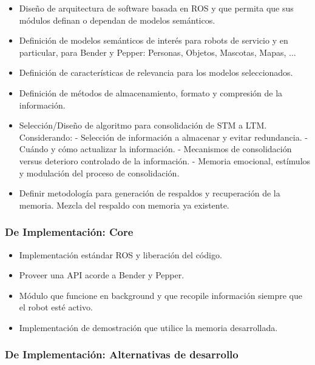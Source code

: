 \documentclass[12pt,letterpaper,spanish]{article}
\begin{document}
\begin{itemize}
\item Dise\~no de arquitectura de software basada en ROS y que permita que sus m\'odulos definan o dependan de modelos sem\'anticos. 
\item Definici\'on de modelos sem\'anticos de inter\'es para robots de servicio y en particular, para Bender y Pepper: Personas, Objetos, Mascotas, Mapas, ...
\item Definici\'on de caracter\'isticas de relevancia para los modelos seleccionados.
\item Definici\'on de m\'etodos de almacenamiento, formato y compresi\'on de la informaci\'on.
\item Selecci\'on/Dise\~no de algoritmo para consolidaci\'on de STM a LTM. Considerando:
\subitem - Selecci\'on de informaci\'on a almacenar y evitar redundancia.
\subitem - Cu\'ando y c\'omo actualizar la informaci\'on.
\subitem - Mecanismos de consolidaci\'on versus deterioro controlado de la informaci\'on.
\subitem - Memoria emocional, est\'imulos y modulaci\'on del proceso de consolidaci\'on.
\item Definir metodolog\'ia para generaci\'on de respaldos y recuperaci\'on de la memoria. Mezcla del respaldo con memoria ya existente.
\end{itemize}

\subsubsection{De Implementaci\'on: Core}

\begin{itemize}
\item Implementaci\'on est\'andar ROS y liberaci\'on del c\'odigo.
\item Proveer una API acorde a Bender y Pepper.
\item M\'odulo que funcione en background y que recopile informaci\'on siempre que el robot est\'e activo.
\item Implementaci\'on de demostraci\'on que utilice la memoria desarrollada.
\end{itemize}

\subsubsection{De Implementaci\'on: Alternativas de desarrollo}
\end{document}
